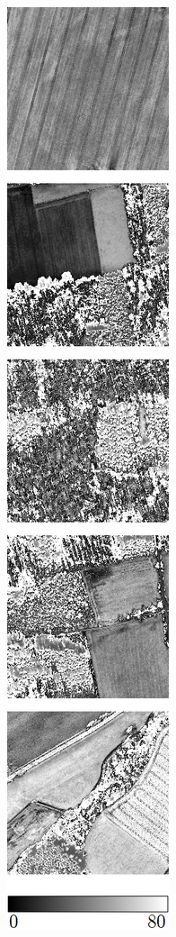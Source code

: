 \begin{figure}
\begin{subfigure}{\VegetationImageWidth}
        \caption{}
        \label{fig:svi_savi}
    \end{subfigure} \hspace{2mm}
    \begin{subfigure}{\VegetationImageWidth}
        \includegraphics[width=\textwidth]{images/vegetation/msavi}
        \caption{}
        \label{fig:svi_msavi}
    \end{subfigure}


\end{figure}

